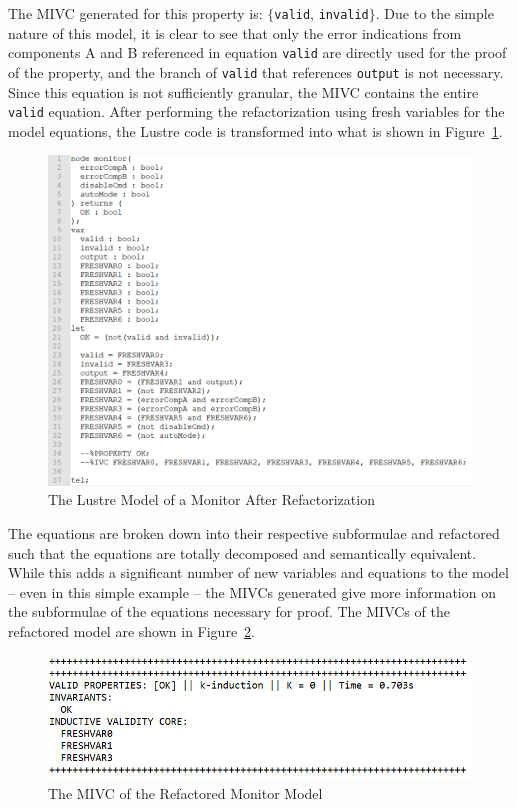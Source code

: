 The MIVC generated for this property is: $\{$\texttt{valid}, \texttt{invalid}$\}$. Due to the simple nature of this model, it is clear to see that only the error indications from components A and B referenced in equation \texttt{valid} are directly used for the proof of the property, and the branch of \texttt{valid} that references \texttt{output} is not necessary. Since this equation is not sufficiently granular, the MIVC contains the entire \texttt{valid} equation. After performing the refactorization using fresh variables for the model equations, the Lustre code is transformed into what is shown in Figure~\ref{fig:monitorFreshLustre}. 
\begin{figure}[h!]
\begin{center}
\includegraphics[width=.8\textwidth]{images/monitorFreshLustre.PNG}
\caption{The Lustre Model of a Monitor After Refactorization} \label{fig:monitorFreshLustre}
\end{center}
\end{figure} 

The equations are broken down into their respective subformulae and refactored such that the equations are totally decomposed and semantically equivalent. While this adds a significant number of new variables and equations to the model -- even in this simple example -- the MIVCs generated give more information on the subformulae of the equations necessary for proof. The MIVCs of the refactored model are shown in Figure~\ref{fig:monitorFreshIVCs}. 
\begin{figure}[h!]
\begin{center}
\includegraphics[width=.6\textwidth]{images/monitorFreshIVCs.PNG}
\caption{The MIVC of the Refactored Monitor Model} \label{fig:monitorFreshIVCs}
\end{center}
\end{figure} 

